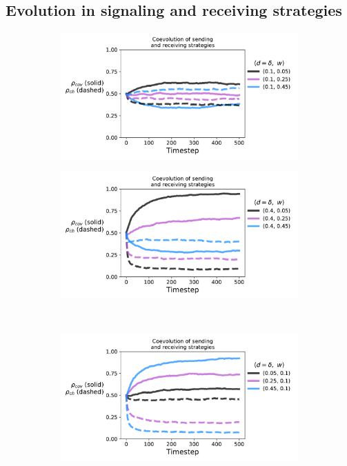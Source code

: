 \documentclass[11pt,letterpaper]{article}
\begin{document}
\begin{appendices}

\section{Evolution in signaling and receiving strategies}

\begin{figure}[H]
  \centering
  \begin{subfigure}{0.49\textwidth}
    \includegraphics[width=\textwidth]{Figures/disliking_evo_d=0p1.pdf}
  \caption{}
  \end{subfigure}
  \begin{subfigure}{0.49\textwidth}
    \includegraphics[width=\textwidth]{Figures/disliking_evo_d=0p4.pdf}
  \caption{}
  \end{subfigure} \\
  \begin{subfigure}{0.49\textwidth}
    \includegraphics[width=\textwidth]{Figures/disliking_evo_w=0p1.pdf}

\end{subfigure}
\end{figure}
\end{appendices}
\end{document}
